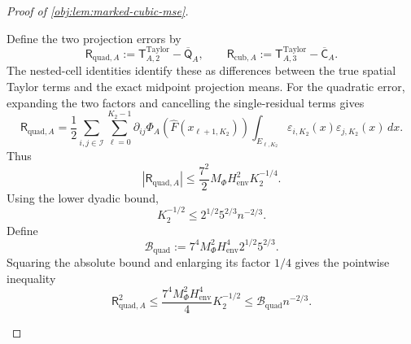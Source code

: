 \begin{proof}[Proof of \cref{obj:lem:marked-cubic-mse}]
\begin{enumerate}
Define the two projection errors by
\[
\mathsf R_{\mathrm{quad},A}
:=\mathsf T^{\mathrm{Taylor}}_{A,2}
-\overline{\mathsf Q}_A,
\qquad
\mathsf R_{\mathrm{cub},A}
:=\mathsf T^{\mathrm{Taylor}}_{A,3}
-\overline{\mathsf C}_A.
\]
The nested-cell identities identify these as differences between the true spatial Taylor terms and the exact midpoint projection means. For the quadratic error, expanding the two factors and cancelling the single-residual terms gives
\[
\mathsf R_{\mathrm{quad},A}
=
\frac12\sum_{i,j\in\mathcal I}\sum_{\ell=0}^{K_2-1}
\partial_{ij}\Phi_A(\widehat F(x_{\ell+1,K_2}))
\int_{E_{\ell,K_2}}
\varepsilon_{i,K_2}(x)\varepsilon_{j,K_2}(x)\,dx.
\]
Thus
\[
|\mathsf R_{\mathrm{quad},A}|
\le\frac{7^2}{2}M_\Phi H_{\mathrm{env}}^2K_2^{-1/4}.
\]
Using the lower dyadic bound,
\[
K_2^{-1/2}
\le2^{1/2}5^{2/3}n^{-2/3}.
\]
Define
\[
\mathcal B_{\mathrm{quad}}
:=7^4M_\Phi^2H_{\mathrm{env}}^4
2^{1/2}5^{2/3}.
\]
Squaring the absolute bound and enlarging its factor \(1/4\) gives the pointwise inequality
\[
\mathsf R_{\mathrm{quad},A}^2
\le\frac{7^4M_\Phi^2H_{\mathrm{env}}^4}{4}K_2^{-1/2}
\le\mathcal B_{\mathrm{quad}}n^{-2/3}.
\]


\end{enumerate}
\end{proof}
